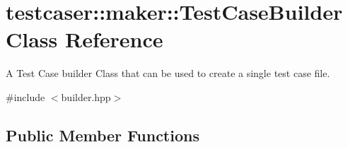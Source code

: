 \hypertarget{classtestcaser_1_1maker_1_1TestCaseBuilder}{}\section{testcaser\+::maker\+::Test\+Case\+Builder Class Reference}
\label{classtestcaser_1_1maker_1_1TestCaseBuilder}


A Test Case builder Class that can be used to create a single test case file.  




{\ttfamily \#include $<$builder.\+hpp$>$}

\subsection*{Public Member Functions}
